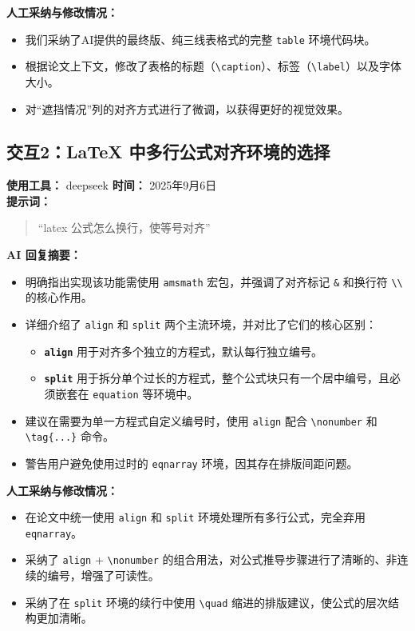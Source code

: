 \documentclass[12pt,a4paper]{article}
\begin{document}
\textbf{人工采纳与修改情况：}
\begin{itemize}
\item 我们采纳了AI提供的最终版、纯三线表格式的完整 \texttt{table} 环境代码块。
\item 根据论文上下文，修改了表格的标题（\texttt{\textbackslash caption}）、标签（\texttt{\textbackslash label}）以及字体大小。
\item 对“遮挡情况”列的对齐方式进行了微调，以获得更好的视觉效果。
\end{itemize}


\vspace{1em} %

\subsection*{交互2：LaTeX 中多行公式对齐环境的选择}
\textbf{使用工具：} deepseek \quad \textbf{时间：} 2025年9月6日 \\
\textbf{提示词：}
\begin{quote}
“latex 公式怎么换行，使等号对齐”
\end{quote}

\textbf{AI 回复摘要：}
\begin{itemize}
    \item 明确指出实现该功能需使用 \texttt{amsmath} 宏包，并强调了对齐标记 \texttt{\&} 和换行符 \texttt{\textbackslash\textbackslash} 的核心作用。
    \item 详细介绍了 \texttt{align} 和 \texttt{split} 两个主流环境，并对比了它们的核心区别：
    \begin{itemize}
        \item \textbf{\texttt{align}} 用于对齐多个独立的方程式，默认每行独立编号。
        \item \textbf{\texttt{split}} 用于拆分单个过长的方程式，整个公式块只有一个居中编号，且必须嵌套在 \texttt{equation} 等环境中。
    \end{itemize}
    \item 建议在需要为单一方程式自定义编号时，使用 \texttt{align} 配合 \texttt{\textbackslash nonumber} 和 \texttt{\textbackslash tag\{...\}} 命令。
    \item 警告用户避免使用过时的 \texttt{eqnarray} 环境，因其存在排版间距问题。
\end{itemize}

\textbf{人工采纳与修改情况：}
\begin{itemize}
    \item 在论文中统一使用 \texttt{align} 和 \texttt{split} 环境处理所有多行公式，完全弃用 \texttt{eqnarray}。
    \item 采纳了 \texttt{align} + \texttt{\textbackslash nonumber} 的组合用法，对公式推导步骤进行了清晰的、非连续的编号，增强了可读性。
    \item 采纳了在 \texttt{split} 环境的续行中使用 \texttt{\textbackslash quad} 缩进的排版建议，使公式的层次结构更加清晰。
\end{itemize}
\end{document}
